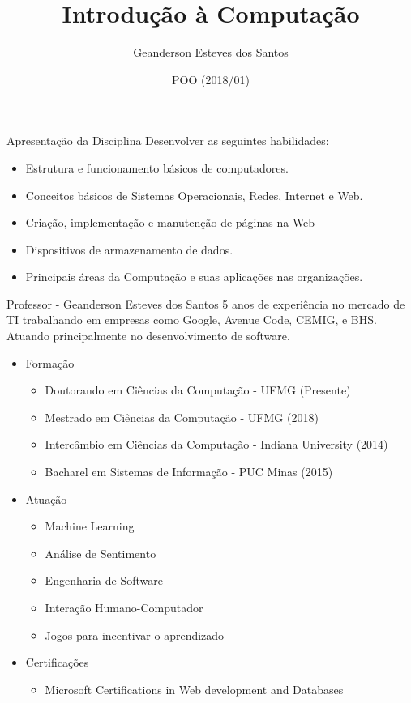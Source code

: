 \documentclass{beamer}
\title{Introdução à Computação}
\author{Geanderson Esteves dos Santos}
\institute[] 
{
  Pontifícia Universidade Católica de Minas Gerais\\
  Instituto de Ciências Exatas e Informática
}
\date{POO (2018/01)}
\begin{document}
\begin{frame}
  \titlepage
\end{frame}

\begin{frame}{Apresentação da Disciplina}
Desenvolver as seguintes habilidades:
\begin{itemize}
\item Estrutura e funcionamento básicos de computadores.
\item Conceitos básicos de Sistemas Operacionais, Redes, Internet e Web.
\item Criação, implementação e manutenção de páginas na Web
\item Dispositivos de armazenamento de dados.
\item Principais áreas da Computação e suas aplicações nas organizações.
\end{itemize}
\end{frame}

\begin{frame}{Professor - Geanderson Esteves dos Santos}
5 anos de experiência no mercado de TI trabalhando em empresas como Google, Avenue Code, CEMIG, e BHS. Atuando principalmente no desenvolvimento de software.
\begin{itemize}
\item Formação
\begin{itemize}
    \item Doutorando em Ciências da Computação - UFMG (Presente)
    \item Mestrado em Ciências da Computação - UFMG (2018)
    \item Intercâmbio em Ciências da Computação - Indiana University (2014)
    \item Bacharel em Sistemas de Informação - PUC Minas (2015)
\end{itemize}
\item Atuação
\begin{itemize}
    \item Machine Learning
    \item Análise de Sentimento
    \item Engenharia de Software
    \item Interação Humano-Computador
    \item Jogos para incentivar o aprendizado
\end{itemize}
\item Certificações
\begin{itemize}
    \item Microsoft Certifications in Web development and Databases
\end{itemize}
\end{itemize}
\end{frame}
\end{document}
